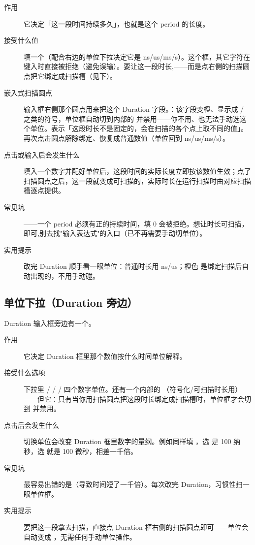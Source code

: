 \documentclass[11pt,oneside,openany]{book}
\begin{document}
\begin{description}
\item[作用] 它决定「这一段时间持续多久」，也就是这个 period 的长度。
\item[接受什么值] 填一个（配合右边的单位下拉决定它是 ns/us/ms/s）。这个框，其它字符在键入时直接被拒绝（避免误输）。要让这一段时长,——而是点右侧的扫描圆点把它绑定成扫描槽（见下）。
\item[嵌入式扫描圆点] 输入框右侧那个圆点用来把这个 Duration 字段。：该字段变橙、显示成 / 之类的符号，单位框自动切到内部的  并禁用——你不用、也无法手动选这个单位。表示「这段时长不是固定的，会在扫描的各个点上取不同的值」。再次点击圆点解除绑定、恢复成普通数值（单位回到 ns/us/ms/s）。
\item[点击或输入后会发生什么] 填入一个数字并配好单位后，这段时间的实际长度立即按该数值生效；点了扫描圆点之后，这一段就变成可扫描的，实际时长在运行扫描时由对应扫描槽逐点提供。
\item[常见坑] ——一个 period 必须有正的持续时间，填 0 会被拒绝。想让时长可扫描，即可,别去找"输入表达式"的入口（已不再需要手动切单位）。
\item[实用提示] 改完 Duration 顺手看一眼单位：普通时长用 ns/us；橙色  是绑定扫描后自动出现的，不用手动碰。
\end{description}

\subsection{单位下拉（Duration 旁边）}

Duration 输入框旁边有一个。

\begin{description}
\item[作用] 它决定 Duration 框里那个数值按什么时间单位解释。
\item[接受什么选项] 下拉里  /  /  /  四个数字单位。还有一个内部的 （符号化/可扫描时长用）——但它：只有当你用扫描圆点把这段时长绑定成扫描槽时，单位框才会切到  并禁用。
\item[点击后会发生什么] 切换单位会改变 Duration 框里数字的量纲。例如同样填 ，选  是 100 纳秒，选  就是 100 微秒，相差一千倍。
\item[常见坑] 最容易出错的是（导致时间短了一千倍）。每次改完 Duration，习惯性扫一眼单位框。
\item[实用提示] 要把这一段拿去扫描，直接点 Duration 框右侧的扫描圆点即可——单位会自动变成 ，无需任何手动单位操作。
\end{description}
\end{document}

